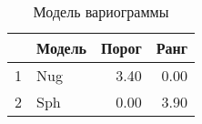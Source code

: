 \begin{table}[H]
\centering
\begin{tabular}{rlrr}
  \hline
 & Модель & Порог & Ранг \\ 
  \hline
1 & Nug & 3.40 & 0.00 \\ 
  2 & Sph & 0.00 & 3.90 \\ 
   \hline
\end{tabular}
\caption{Модель вариограммы} 
\label{table:manual_model}
\end{table}
